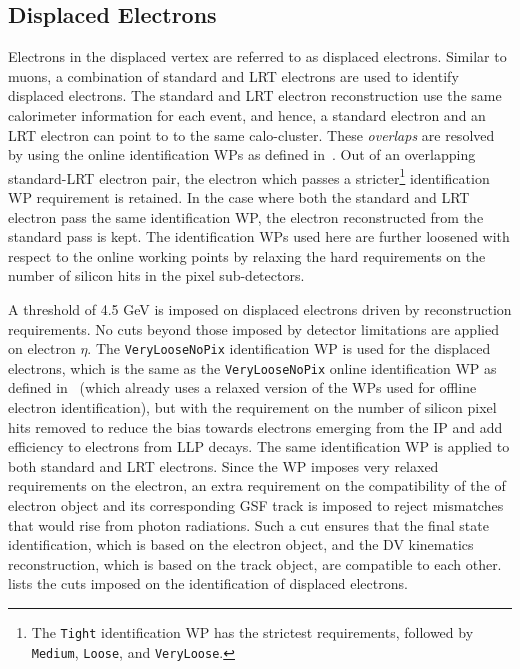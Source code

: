 \subsection{Displaced Electrons}
Electrons in the displaced vertex are referred to as displaced electrons. Similar to muons, a combination of standard and LRT electrons are used to identify displaced electrons. The standard and LRT electron reconstruction use the same calorimeter information for each event, and hence, a standard electron and an LRT electron can point to to the same calo-cluster. These \textit{overlaps} are resolved by using the online identification WPs as defined in~\cite{PERF-2017-01}. Out of an overlapping standard-LRT electron pair, the electron which passes a stricter\footnote{The \texttt{Tight} identification WP has the strictest requirements, followed by \texttt{Medium}, \texttt{Loose}, and \texttt{VeryLoose}.} identification WP requirement is retained. In the case where both the standard and LRT electron pass the same identification WP, the electron reconstructed from the standard pass is kept. The identification WPs used here are further loosened with respect to the online working points by relaxing the hard requirements on the number of silicon hits in the pixel sub-detectors. 

A \pT threshold of 4.5 GeV is imposed on displaced electrons driven by reconstruction requirements. No cuts beyond those imposed by detector limitations are applied on electron $\eta$. The \texttt{VeryLooseNoPix} identification WP is used for the displaced electrons, which is the same as the \texttt{VeryLooseNoPix} online identification WP as defined in~\cite{PERF-2017-01} (which already uses a relaxed version of the WPs used for offline electron identification), but with the requirement on the number of silicon pixel hits removed to reduce the bias towards electrons emerging from the IP and add efficiency to electrons from LLP decays. The same identification WP is applied to both standard and LRT electrons. Since the WP imposes very relaxed requirements on the electron, an extra requirement on the compatibility of the \pT of electron object and its corresponding GSF track is imposed to reject mismatches that would rise from photon radiations. Such a cut ensures that the final state identification, which is based on the electron object, and the DV kinematics reconstruction, which is based on the track object, are compatible to each other.~ lists the cuts imposed on the identification of displaced electrons.

